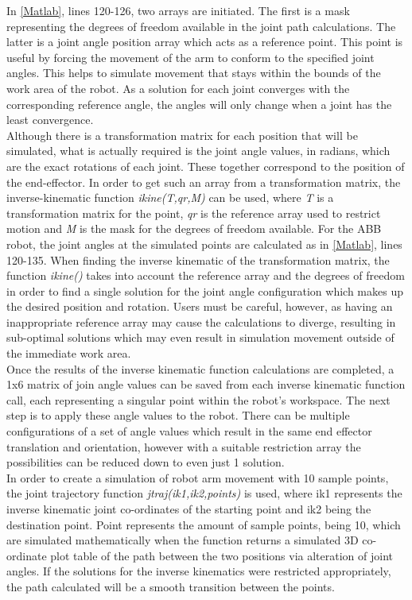 \documentclass[11pt,a4paper, margin=1in]{report}
\begin{document}
In \cref{Matlab}, lines 120-126, two arrays are initiated. The first is a mask representing the degrees of freedom available in the joint path calculations. The latter is a joint angle position array which acts as a reference point. This point is useful by forcing the movement of the arm to conform to the specified joint angles. This helps to simulate movement that stays within the bounds of the work area of the robot. As a solution for each joint converges with the corresponding reference angle, the angles will only change when a joint has the least convergence.\\
Although there is a transformation matrix for each position that will be simulated, what is actually required is the joint angle values, in radians, which are the exact rotations of each joint. These together correspond to the position of the end-effector. In order to get such an array from a transformation matrix, the inverse-kinematic function \textit{ikine(T,qr,M)} can be used, where \textit{T} is a transformation matrix for the point, \textit{qr} is the reference array used to restrict motion and\textit{ M} is the mask for the degrees of freedom available. For the ABB robot, the joint angles at the simulated points are calculated as in \cref{Matlab}, lines 120-135. When finding the inverse kinematic of the transformation matrix, the function \textit{ikine()} takes into account the reference array and the degrees of freedom in order to find a single solution for the joint angle configuration which makes up the desired position and rotation. Users must be careful, however, as having an inappropriate reference array may cause the calculations to diverge, resulting in sub-optimal solutions which may even result in simulation movement outside of the immediate work area.\\
Once the results of the inverse kinematic function calculations are completed, a 1x6 matrix of join angle values can be saved from each inverse kinematic function call, each representing a singular point within the robot's workspace. The next step is to apply these angle values to the robot. There can be multiple configurations of a set of angle values which result in the same end effector translation and orientation, however with a suitable restriction array the possibilities can be reduced down to even just 1 solution.\\
In order to create a simulation of robot arm movement with 10 sample points, the joint trajectory function \textit{jtraj(ik1,ik2,points)} is used, where ik1 represents the inverse kinematic joint co-ordinates of the starting point and ik2 being the destination point. Point represents the amount of sample points, being 10, which are simulated mathematically when the function returns a simulated 3D co-ordinate plot table of the path between the two positions via alteration of joint angles. If the solutions for the inverse kinematics were restricted appropriately, the path calculated will be a smooth transition between the points.\\
\end{document}
